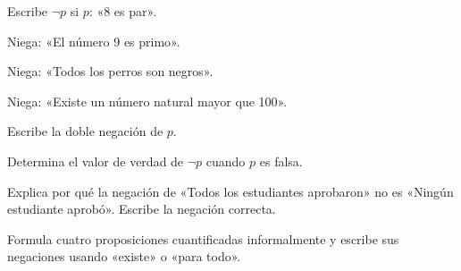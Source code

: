 \begin{activity}[id=dia-03-corta-01,type=short,weight=1]

Escribe \(\neg p\) si \(p\): «8 es par».

\end{activity}

\begin{activity}[id=dia-03-corta-02,type=short,weight=1]

Niega: «El número 9 es primo».

\end{activity}

\begin{activity}[id=dia-03-corta-03,type=short,weight=1]

Niega: «Todos los perros son negros».

\end{activity}

\begin{activity}[id=dia-03-corta-04,type=short,weight=1]

Niega: «Existe un número natural mayor que 100».

\end{activity}

\begin{activity}[id=dia-03-corta-05,type=short,weight=1]

Escribe la doble negación de \(p\).

\end{activity}

\begin{activity}[id=dia-03-corta-06,type=short,weight=1]

Determina el valor de verdad de \(\neg p\) cuando \(p\) es falsa.

\end{activity}

\begin{activity}[id=dia-03-desarrollo-01,type=long,weight=2]

Explica por qué la negación de «Todos los estudiantes aprobaron» no es «Ningún estudiante aprobó». Escribe la negación correcta.

\end{activity}

\begin{activity}[id=dia-03-desarrollo-02,type=long,weight=2]

Formula cuatro proposiciones cuantificadas informalmente y escribe sus negaciones usando «existe» o «para todo».

\end{activity}

